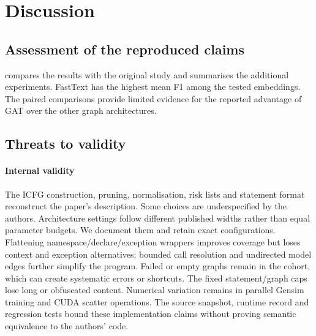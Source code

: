 \section{Discussion}\label{sec:discussion}

\subsection{Assessment of the reproduced claims}
 compares the results with the original study and summarises the additional experiments.
FastText has the highest mean F1 among the tested embeddings. The paired comparisons provide limited
evidence for the reported advantage of GAT over the other graph architectures.

\begin{table}[!t]\centering\footnotesize
\caption{Claim assessment from the completed v2 evidence. Scope and uncertainty accompany each item.}\label{tab:verdict}

\end{table}

\subsection{Threats to validity}\label{sec:threats}
\paragraph{Internal validity}
The ICFG construction, pruning, normalisation, risk lists and statement format reconstruct the paper's description.
Some choices are underspecified by the authors. Architecture settings follow different published widths rather than equal parameter budgets. We document them and retain exact configurations.
Flattening namespace/declare/exception wrappers improves coverage but loses context and exception alternatives;
bounded call resolution and undirected model edges further simplify the program. Failed or empty graphs remain
in the cohort, which can create systematic errors or shortcuts. The fixed statement/graph caps lose long or
obfuscated content. Numerical variation remains in parallel Gensim training and CUDA scatter operations.
The source snapshot, runtime record and regression tests bound these implementation claims without proving
semantic equivalence to the authors' code.


